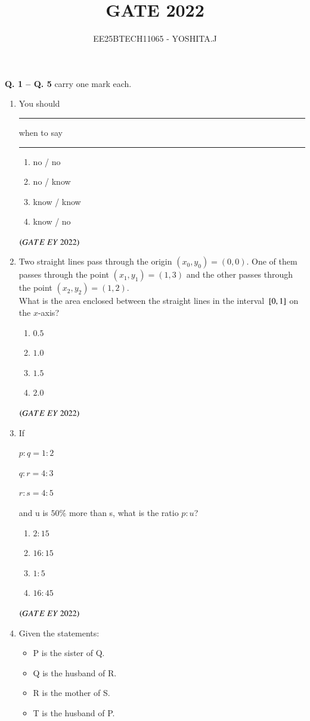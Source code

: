 \documentclass[journal]{IEEEtran}
\numberwithin{equation}{enumi}
\numberwithin{figure}{enumi}
\begin{document}

\vspace{3cm}

\title{GATE 2022}
\author{EE25BTECH11065 - YOSHITA.J}
\maketitle

\noindent \textbf{Q. 1 -- Q. \textbf{5}} carry one mark each.

\begin{enumerate}
    \item You should \rule{3cm}{0.15mm} when to say \rule{3cm}{0.15mm}
    \begin{enumerate}
        \item  no / no
        \item  no / know
        \item  know / know
        \item  know / no
    \end{enumerate}
    \hfill{$\brak{ GATE\ EY\ 2022}$}
    \bigskip
     \item Two straight lines pass through the origin $(x_0, y_0) = (0,0)$. One of them passes
through the point $(x_1, y_1) = (1,3)$ and the other passes through the point
$(x_2,y_2) = (1,2)$.
\\
What is the area enclosed between the straight lines in the interval ${}\left[0, 1\right]$ on
the $x$-axis?
    \begin{enumerate}
        \item  $0.5$
        \item  $1.0$
        \item  $1.5$
        \item  $2.0$
    \end{enumerate}
    \hfill{$\brak{ GATE\ EY\ 2022}$}
    \bigskip
     \item If

$p:q=1:2$

$q:r = 4:3$

$r : s = 4:5$

and u is $50\%$ more than s, what is the ratio $p : u$?
    \begin{enumerate}
        \item  $2:15$
        \item  $16:15$
        \item  $1:5$
        \item  $16:45$
    \end{enumerate}
    \hfill{$\brak{ GATE\ EY\ 2022}$}
    \bigskip
     \item Given the statements:
     \begin{itemize}[label=$\bullet$]
    \item P is the sister of Q.
    \item Q is the husband of R.
    \item R is the mother of S.
    \item T is the husband of P.
   \end{itemize}
    

\end{enumerate}
\end{document}
